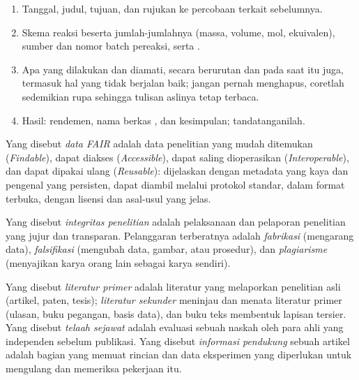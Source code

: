 \begin{method}\label{met:b3:lab-techniques-3:notebook}
\begin{enumerate}
  \item Tanggal, judul, tujuan, dan rujukan ke percobaan terkait sebelumnya.
  \item Skema reaksi beserta jumlah-jumlahnya (massa, volume, mol, ekuivalen),
        sumber dan nomor batch pereaksi, serta .
  \item Apa yang dilakukan dan diamati, secara berurutan dan pada saat itu juga, termasuk hal yang
        tidak berjalan baik; jangan pernah menghapus, coretlah sedemikian rupa sehingga tulisan aslinya tetap terbaca.
  \item Hasil: rendemen, nama berkas , dan kesimpulan; tandatanganilah.
\end{enumerate}
\end{method}

\begin{definition}\label{def:b3:lab-techniques-3:fair}
Yang disebut \emph{data FAIR} adalah data penelitian yang mudah ditemukan (\textit{Findable}),
dapat diakses (\textit{Accessible}), dapat saling dioperasikan (\textit{Interoperable}), dan dapat dipakai ulang (\textit{Reusable}): dijelaskan dengan metadata yang kaya dan
pengenal yang persisten, dapat diambil melalui protokol standar, dalam format terbuka, dengan
lisensi dan asal-usul yang jelas.
\end{definition}

\begin{definition}\label{def:b3:lab-techniques-3:integrity}
Yang disebut \emph{integritas penelitian} adalah pelaksanaan dan pelaporan
penelitian yang jujur dan transparan. Pelanggaran terberatnya adalah
\emph{fabrikasi} (mengarang data), \emph{falsifikasi}
(mengubah data, gambar, atau prosedur), dan \emph{plagiarisme}
(menyajikan karya orang lain sebagai karya sendiri).
\end{definition}

\begin{definition}[Literatur]\label{def:b3:lab-techniques-3:literature}
Yang disebut \emph{literatur primer} adalah literatur yang melaporkan penelitian
asli (artikel, paten, tesis); \emph{literatur
sekunder} meninjau dan menata literatur primer (ulasan,
buku pegangan, basis data), dan buku teks membentuk lapisan tersier. Yang disebut \emph{telaah
sejawat} adalah evaluasi sebuah naskah oleh para ahli yang independen
sebelum publikasi. Yang disebut \emph{informasi pendukung}
sebuah artikel adalah bagian yang memuat rincian dan data eksperimen yang diperlukan untuk
mengulang dan memeriksa pekerjaan itu.
\end{definition}

